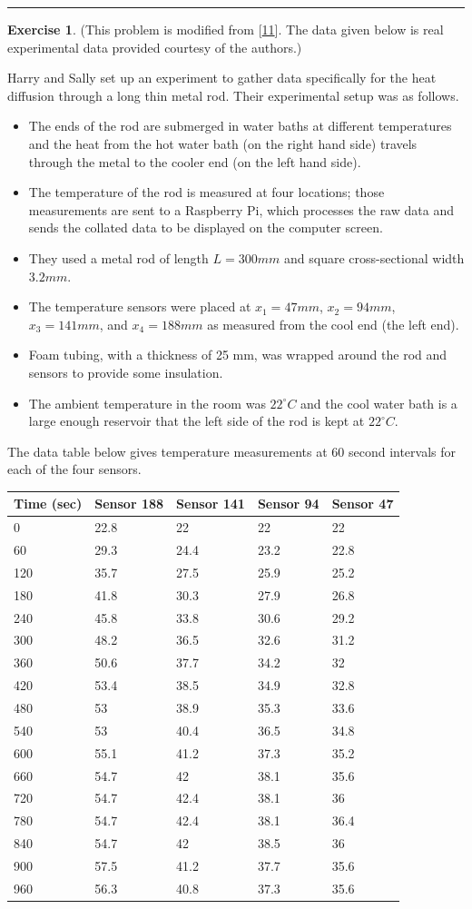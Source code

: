 \documentclass[
]{book}
\providecommand{\tightlist}{%
  \setlength{\itemsep}{0pt}\setlength{\parskip}{0pt}}
\theoremstyle{definition}
\theoremstyle{definition}
\theoremstyle{definition}
\newtheorem{exercise}{Exercise}[chapter]
\theoremstyle{remark}
\begin{document}
\begin{center}\rule{0.5\linewidth}{0.5pt}\end{center}

\begin{exercise}
\protect\hypertarget{exr:unnamed-chunk-619}{}{\label{exr:unnamed-chunk-619} }(This problem is modified from {[}\protect\hyperlink{ref-simiodeheat}{11}{]}. The data given below is real experimental data provided courtesy of the authors.)

Harry and Sally set up an experiment to gather data specifically for the heat diffusion through a long thin metal rod. Their experimental setup was as follows.

\begin{itemize}
\tightlist
\item
  The ends of the rod are submerged in water baths at different temperatures and the heat from the hot water bath (on the right hand side) travels through the metal to the cooler end (on the left hand side).
\item
  The temperature of the rod is measured at four locations; those measurements are sent to a Raspberry Pi, which processes the raw data and sends the collated data to be displayed on the computer screen.
\item
  They used a metal rod of length \(L = 300 mm\) and square cross-sectional width \(3.2 mm\).\\
\item
  The temperature sensors were placed at \(x_1 = 47mm\), \(x_2 = 94mm\), \(x_3 = 141mm\), and \(x_4 = 188mm\) as measured from the cool end (the left end).
\item
  Foam tubing, with a thickness of 25 mm, was wrapped around the rod and sensors to provide some insulation.
\item
  The ambient temperature in the room was \(22^\circ C\) and the cool water bath is a large enough reservoir that the left side of the rod is kept at \(22^\circ C\).
\end{itemize}

The data table below gives temperature measurements at 60 second intervals for each of the four sensors.

\begin{longtable}[]{@{}lllll@{}}
\toprule
Time (sec) & Sensor 188 & Sensor 141 & Sensor 94 & Sensor 47\tabularnewline
\midrule
\endhead
0 & 22.8 & 22 & 22 & 22\tabularnewline
60 & 29.3 & 24.4 & 23.2 & 22.8\tabularnewline
120 & 35.7 & 27.5 & 25.9 & 25.2\tabularnewline
180 & 41.8 & 30.3 & 27.9 & 26.8\tabularnewline
240 & 45.8 & 33.8 & 30.6 & 29.2\tabularnewline
300 & 48.2 & 36.5 & 32.6 & 31.2\tabularnewline
360 & 50.6 & 37.7 & 34.2 & 32\tabularnewline
420 & 53.4 & 38.5 & 34.9 & 32.8\tabularnewline
480 & 53 & 38.9 & 35.3 & 33.6\tabularnewline
540 & 53 & 40.4 & 36.5 & 34.8\tabularnewline
600 & 55.1 & 41.2 & 37.3 & 35.2\tabularnewline
660 & 54.7 & 42 & 38.1 & 35.6\tabularnewline
720 & 54.7 & 42.4 & 38.1 & 36\tabularnewline
780 & 54.7 & 42.4 & 38.1 & 36.4\tabularnewline
840 & 54.7 & 42 & 38.5 & 36\tabularnewline
900 & 57.5 & 41.2 & 37.7 & 35.6\tabularnewline
960 & 56.3 & 40.8 & 37.3 & 35.6\tabularnewline
\bottomrule
\end{longtable}


\end{exercise}
\end{document}
